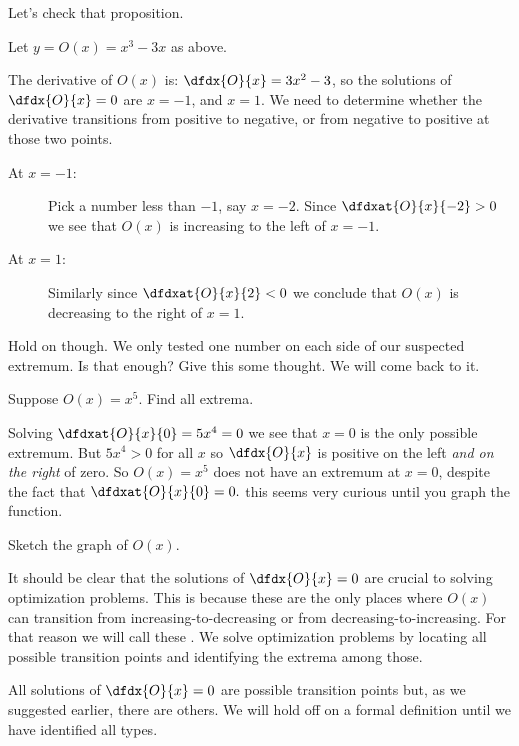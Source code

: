 Let's check that proposition.
\begin{myexample}
  \label{problem:PPT}
  Let $y= O(x)=x^3-3x$ as above.

   The derivative of $O(x)$ is:
  $\dfdx{O}{x}=3x^2-3$, so the solutions of $\dfdx{O}{x}=0$ are
  $x=-1$, and $x=1$. We need to determine whether the derivative
  transitions from positive to negative, or from negative to positive at
  those two points.
  \begin{description}
  \item[At $x=-1$:] Pick a number less than $-1$, say $x=-2.$ Since
    $\dfdxat{O}{x}{-2}>0$ we see that $O(x)$ is increasing to the left
    of $x=-1.$ 
  \item[At $x=1$:] Similarly since $\dfdxat{O}{x}{2}<0$ we conclude that
    $O(x)$ is decreasing to the right of $x=1$.
  \end{description}
  Hold on though. We only tested one number on each side of our
  suspected extremum. Is that enough? Give this some thought. We will
  come back to it.
\end{myexample}


\begin{myexample}
  \label{example:x^5}
  Suppose $O(x)=x^5$. Find all extrema.

  Solving $\dfdxat{O}{x}{0}=5x^4=0$ we see that $x=0$ is the only
  possible extremum. But $5x^4>0$ for all $x$ so $\dfdx{O}{x}$ is
  positive on the left
  \emph{and on the right} of zero. So $O(x)=x^5$ does not have an
  extremum at $x=0$, despite the fact that $\dfdxat{O}{x}{0}=0.$
  this seems very curious until you graph the function.
  
  \begin{ProficiencyDrill}
    Sketch the graph of $O(x)$.       
  \end{ProficiencyDrill}
\end{myexample}

It should be clear that the solutions of $\dfdx{O}{x}=0$ are crucial
to solving optimization problems. This is because these are the only
places where
$O(x)$ can
transition from increasing-to-decreasing or from
decreasing-to-increasing. For that reason we will call these . We solve optimization problems by locating
all possible transition points and identifying the extrema among
those. 

All solutions of $\dfdx{O}{x}=0$ are possible transition points but,
as we suggested earlier, there are others. We will hold off on a
formal definition until we have identified all types.

